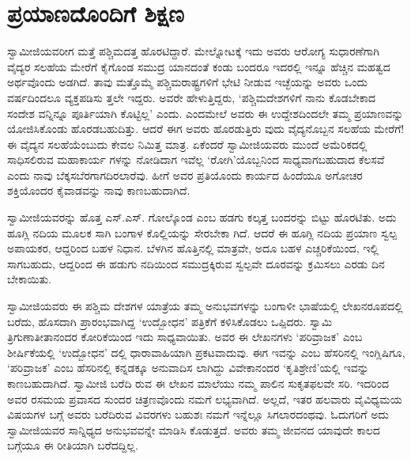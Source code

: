 
\chapter{ಪ್ರಯಾಣದೊಂದಿಗೆ ಶಿಕ್ಷಣ}

\noindent

ಸ್ವಾಮೀಜಿಯವರೀಗ ಮತ್ತೆ ಪಶ್ಚಿಮದತ್ತ ಹೊರಟಿದ್ದಾರೆ. ಮೇಲ್ನೋಟಕ್ಕೆ ಇದು ಅವರು ಆರೋಗ್ಯ ಸುಧಾರಣೆಗಾಗಿ ವೈದ್ಯರ ಸಲಹೆಯ ಮೇರೆಗೆ ಕೈಗೊಂಡ ಸಮುದ್ರ ಯಾನದಂತೆ ಕಂಡು ಬಂದರೂ ಇದರಲ್ಲಿ ಇನ್ನೂ ಹೆಚ್ಚಿನ ಮಹತ್ವದ ಅರ್ಥವೊಂದು ಅಡಗಿದೆ. ತಾವು ಮತ್ತೊಮ್ಮೆ ಪಶ್ಚಿಮರಾಷ್ಟ್ರಗಳಿಗೆ ಭೇಟಿ ನೀಡುವ ಇಚ್ಛೆಯನ್ನು ಅವರು ಒಂದು ವರ್ಷದಿಂದಲೂ ವ್ಯಕ್ತಪಡಿಸು ತ್ತಲೇ ಇದ್ದರು. ಅವರೇ ಹೇಳುತ್ತಿದ್ದರು, ‘ಪಶ್ಚಿಮದೇಶಗಳಿಗೆ ನಾನು ಕೊಡಬೇಕಾದ ಸಂದೇಶ ವನ್ನಿನ್ನೂ ಪೂರ್ತಿಯಾಗಿ ಕೊಟ್ಟಿಲ್ಲ’ ಎಂದು. ಎಂದಮೇಲೆ ಅವರು ಈ ಉದ್ದೇಶದಿಂದಲೇ ತಮ್ಮ ಪ್ರಯಾಣವನ್ನು ಯೋಜಿಸಿಕೊಂಡು ಹೊರಡಬಹುದಿತ್ತು. ಆದರೆ ಈಗ ಅವರು ಹೊರಡುತ್ತಿರು ವುದು ವೈದ್ಯನೊಬ್ಬನ ಸಲಹೆಯ ಮೇರೆಗೆ! ಈ ವೈದ್ಯನ ಸಲಹೆಯೆಂಬುದು ಕೇವಲ ನಿಮಿತ್ತ ಮಾತ್ರ. ಏಕೆಂದರೆ ಸ್ವಾಮೀಜಿಯವರು ಮುಂದೆ ಅಮೆರಿಕದಲ್ಲಿ ಸಾಧಿಸಲಿರುವ ಮಹಾಕಾರ್ಯ ಗಳನ್ನು ನೋಡಿದಾಗ ಇವೆಲ್ಲ ‘ರೋಗಿ’ಯೊಬ್ಬನಿಂದ ಸಾಧ್ಯವಾಗಬಹುದಾದ ಕೆಲಸವೆ ಎಂದು ನಾವು ಬೆಕ್ಕಸಬೆರಗಾಗದಿರಲಾರೆವು. ಹೀಗೆ ಅವರ ಪ್ರತಿಯೊಂದು ಕಾರ್ಯದ ಹಿಂದೆಯೂ ಅಗೋಚರ ಶಕ್ತಿಯೊಂದರ ಕೈವಾಡವನ್ನು ನಾವು ಕಾಣಬಹುದಾಗಿದೆ.

ಸ್ವಾಮೀಜಿಯವರನ್ನು ಹೊತ್ತ ಎಸ್.ಎಸ್. ಗೋಲ್ಕೊಂಡ ಎಂಬ ಹಡಗು ಕಲ್ಕತ್ತ ಬಂದರನ್ನು ಬಿಟ್ಟು ಹೊರಟಿತು. ಅದು ಹೂಗ್ಲಿ ನದಿಯ ಮೂಲಕ ಸಾಗಿ ಬಂಗಾಳ ಕೊಲ್ಲಿಯನ್ನು ಸೇರಬೇಕಾ ಗಿದೆ. ಆದರೆ ಈ ಹೂಗ್ಲಿ ನದಿಯ ಪ್ರಯಾಣ ಸ್ವಲ್ಪ ಅಪಾಯಕರ, ಆದ್ದರಿಂದ ಬಹಳ ನಿಧಾನ. ಬೆಳಗಿನ ಹೊತ್ತಿನಲ್ಲಿ ಮಾತ್ರವೇ, ಅದೂ ಬಹಳ ಎಚ್ಚರಿಕೆಯಿಂದ, ಇಲ್ಲಿ ಸಾಗಬಹುದು, ಆದ್ದರಿಂದ ಈ ಹಡುಗು ನದಿಯಿಂದ ಸಮುದ್ರಕ್ಕಿರುವ ಸ್ವಲ್ಪವೇ ದೂರವನ್ನು ಕ್ರಮಿಸಲು ಎರಡು ದಿನ ಬೇಕಾಯಿತು.

ಸ್ವಾಮೀಜಿಯವರು ಈ ಪಶ್ಚಿಮ ದೇಶಗಳ ಯಾತ್ರೆಯ ತಮ್ಮ ಅನುಭವಗಳನ್ನು ಬಂಗಾಳೀ ಭಾಷೆಯಲ್ಲಿ ಲೇಖನರೂಪದಲ್ಲಿ ಬರೆದು, ಹೊಸದಾಗಿ ಪ್ರಾರಂಭವಾಗಿದ್ದ ‘ಉದ್ಬೋಧನ’ ಪತ್ರಿಕೆಗೆ ಕಳಿಸಿಕೊಡಲು ಒಪ್ಪಿದರು. ಸ್ವಾಮಿ ತ್ರಿಗುಣಾತೀತಾನಂದರ ಕೋರಿಕೆಯಿಂದ ಇದು ಸಾಧ್ಯವಾಯಿತು. ಅವರ ಈ ಲೇಖನಗಳು ‘ಪರಿವ್ರಾಜಕ’ ಎಂಬ ಶೀರ್ಷಿಕೆಯಲ್ಲಿ ‘ಉದ್ಬೋಧನ’ ದಲ್ಲಿ ಧಾರಾವಾಹಿಯಾಗಿ ಪ್ರಕಟವಾದುವು. ಈಗ ಇವನ್ನು  ಎಂಬ ಹೆಸರಿನಲ್ಲಿ ಇಂಗ್ಲಿಷಿಗೂ, ‘ಪರಿವ್ರಾಜಕ’ ಎಂಬ ಹೆಸರಿನಲ್ಲಿ ಕನ್ನಡಕ್ಕೂ ಅನುವಾದಿಸ ಲಾಗಿದ್ದು ವಿವೇಕಾನಂದರ ‘ಕೃತಿಶ್ರೇಣಿ’ಯಲ್ಲಿ ಇವನ್ನು ಕಾಣಬಹುದಾಗಿದೆ. ಸ್ವಾಮೀಜಿ ಬರೆದಿ ರುವ ಈ ಲೇಖನ ಮಾಲೆಯು ನಮ್ಮ ಪಾಲಿನ ಸುಕೃತಫಲವೇ ಸರಿ. ಇದರಿಂದ ಅವರ ರಸಮಯ ಪ್ರವಾಸದ ಸುಂದರ ಚಿತ್ರಣವೊಂದು ನಮಗೆ ಲಭ್ಯವಾಗಿದೆ. ಅಲ್ಲದೆ, ಇತರ ಹಲವಾರು ವೈವಿಧ್ಯಮಯ ವಿಷಯಗಳ ಬಗ್ಗೆ ಅವರು ಬರೆದಿರುವ ವಿವರಗಳು ಬಹುಶಃ ನಮಗೆ ಇನ್ನೆಲ್ಲೂ ಸಿಗಲಾರದಂಥವು. ಓದುಗರಿಗೆ ಅದು ಸ್ವಾಮೀಜಿಯವರ ಸಾನ್ನಿಧ್ಯದ ಅನುಭವವನ್ನೇ ಮಾಡಿಸಿ ಕೊಡುತ್ತದೆ. ಅವರು ತಮ್ಮ ಜೀವನದ ಯಾವುದೇ ಕಾಲದ ಬಗ್ಗೆಯೂ ಈ ರೀತಿಯಾಗಿ ಬರೆದದ್ದಿಲ್ಲ.

